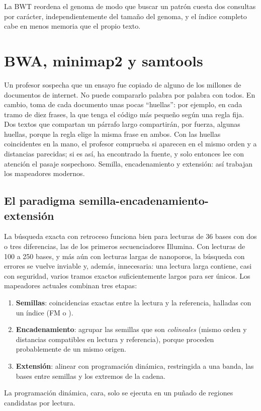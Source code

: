 \begin{ideaclave}
La BWT reordena el genoma de modo que buscar un patrón cuesta dos consultas por carácter, independientemente del tamaño del genoma, y el índice completo cabe en menos memoria que el propio texto.
\end{ideaclave}

\section{BWA, minimap2 y samtools}\label{sec:07-herramientas}

\begin{intuicion}
Un profesor sospecha que un ensayo fue copiado de alguno de los millones de documentos de internet. No puede compararlo palabra por palabra con todos. En cambio, toma de cada documento unas pocas ``huellas'': por ejemplo, en cada tramo de diez frases, la que tenga el código más pequeño según una regla fija. Dos textos que compartan un párrafo largo compartirán, por fuerza, algunas huellas, porque la regla elige la misma frase en ambos. Con las huellas coincidentes en la mano, el profesor comprueba si aparecen en el mismo orden y a distancias parecidas; si es así, ha encontrado la fuente, y solo entonces lee con atención el pasaje sospechoso. Semilla, encadenamiento y extensión: así trabajan los mapeadores modernos.
\end{intuicion}

\subsection{El paradigma semilla-encadenamiento-extensión}

La búsqueda exacta con retroceso funciona bien para lecturas de 36 bases con dos o tres diferencias, las de los primeros secuenciadores Illumina. Con lecturas de 100 a 250 bases, y más aún con lecturas largas de nanoporos, la búsqueda con errores se vuelve inviable y, además, innecesaria: una lectura larga contiene, casi con seguridad, varios tramos exactos suficientemente largos para ser únicos. Los mapeadores actuales combinan tres etapas:
\begin{enumerate}
  \item \textbf{Semillas}: coincidencias exactas entre la lectura y la referencia, halladas con un índice (FM o ).
  \item \textbf{Encadenamiento}: agrupar las semillas que son \emph{colineales} (mismo orden y distancias compatibles en lectura y referencia), porque proceden probablemente de un mismo origen.
  \item \textbf{Extensión}: alinear con programación dinámica, restringida a una banda, las bases entre semillas y los extremos de la cadena.
\end{enumerate}
La programación dinámica, cara, solo se ejecuta en un puñado de regiones candidatas por lectura.

